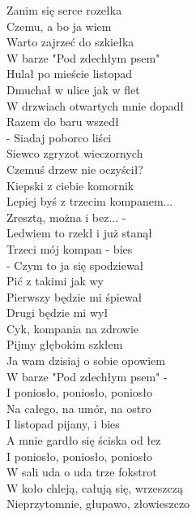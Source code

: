 
Zanim się serce rozełka \\
Czemu, a bo ja wiem \\
Warto zajrzeć do szkiełka \\
W barze "Pod zdechłym psem" \\
Hulał po mieście listopad \\
Dmuchał w ulice jak w flet \\
W drzwiach otwartych mnie dopadł \\
Razem do baru wszedł \\
\hops
- Siadaj poborco liści \\
Siewco zgryzot wieczornych \\
Czemuś drzew nie oczyścił? \\
Kiepski z ciebie komornik \\
Lepiej byś z trzecim kompanem... \\
Zresztą, można i bez... - \\
Ledwiem to rzekł i już stanął \\
Trzeci mój kompan - bies \\
\hops
- Czym to ja się spodziewał \\
Pić z takimi jak wy \\
Pierwszy będzie mi śpiewał \\
Drugi będzie mi wył \\
Cyk, kompania na zdrowie \\
Pijmy głębokim szkłem \\
Ja wam dzisiaj o sobie opowiem \\
W barze "Pod zdechłym psem" - \\
\hops
I poniosło, poniosło, poniosło \\
Na całego, na umór, na ostro \\
I listopad pijany, i bies \\
A mnie gardło się ściska od łez \\
I poniosło, poniosło, poniosło \\
W sali uda o uda trze fokstrot \\
W koło chleją, całują się, wrzeszczą \\
Nieprzytomnie, głupawo, złowieszczo \\

